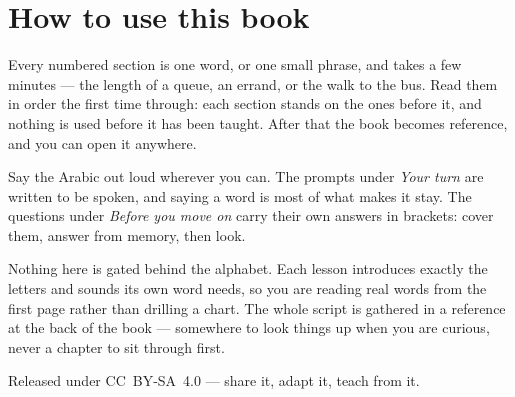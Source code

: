 \documentclass[11pt,twoside]{book}
\begin{document}
\section*{How to use this book}

Every numbered section is one word, or one small phrase, and takes a few
minutes --- the length of a queue, an errand, or the walk to the bus. Read them
in order the first time through: each section stands on the ones before it, and
nothing is used before it has been taught. After that the book becomes
reference, and you can open it anywhere.

Say the Arabic out loud wherever you can. The prompts under \emph{Your turn}
are written to be spoken, and saying a word is most of what makes it stay. The
questions under \emph{Before you move on} carry their own answers in brackets:
cover them, answer from memory, then look.

Nothing here is gated behind the alphabet. Each lesson introduces exactly the
letters and sounds its own word needs, so you are reading real words from the
first page rather than drilling a chart. The whole script is gathered in a
reference at the back of the book --- somewhere to look things up when you are
curious, never a chapter to sit through first.

Released under CC~BY-SA~4.0 --- share it, adapt it, teach from it.

\tableofcontents

\mainmatter


\end{document}
